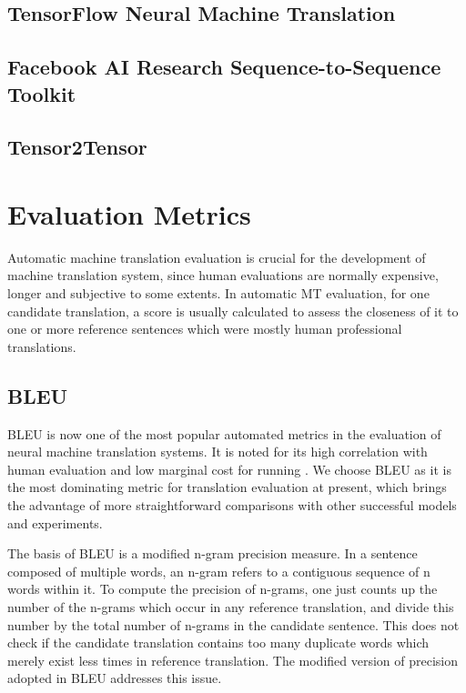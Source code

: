 \subsection{TensorFlow Neural Machine Translation}

\cite{luong17}

\subsection{Facebook AI Research Sequence-to-Sequence Toolkit}

\cite{gehring2017convs2s}

\subsection{Tensor2Tensor}

\cite{tensor2tensor}





\section{Evaluation Metrics}

Automatic machine translation evaluation is crucial for the development of machine translation system, since human evaluations are normally expensive, longer and subjective to some extents. In automatic MT evaluation, for one candidate translation, a score is usually calculated to assess the closeness of it to one or more reference sentences which were mostly human professional translations. 

\subsection{BLEU}

BLEU is now one of the most popular automated metrics in the evaluation of neural machine translation systems. It is noted for its high correlation with human evaluation and low marginal cost for running \cite{Papineni2002}. We choose BLEU as it is the most dominating metric for translation evaluation at present, which brings the advantage of more straightforward comparisons with other successful models and experiments.

The basis of BLEU is a modified n-gram precision measure. In a sentence composed of multiple words, an n-gram refers to a contiguous sequence of n words within it. To compute the precision of n-grams, one just counts up the number of the n-grams which occur in any reference translation, and divide this number by the total number of n-grams in the candidate sentence. This does not check if the candidate translation contains too many duplicate words which merely exist less times in reference translation. The modified version of precision adopted in BLEU addresses this issue. 

